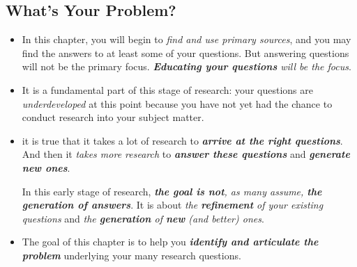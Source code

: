 \documentclass[11pt]{article}
\begin{document}
\subsection{What's Your Problem?}
\begin{itemize}
\item In this chapter, you will begin to \emph{find and use primary sources}, and you may find the answers to at least some of your questions. But answering questions will not be the primary focus. \emph{\textbf{Educating your questions} will be the focus}.

\item It is a fundamental part of this stage of research: your questions are \emph{underdeveloped} at this point because you have not yet had the chance to conduct research into your subject matter.

\item it is true that it takes a lot of research to \emph{\textbf{arrive at the right questions}}.  And then it \emph{takes more research} to \emph{\textbf{answer these questions}} and \emph{\textbf{generate new ones}}. 

In this early stage of research, \emph{\textbf{the goal is not}, as many assume, \textbf{the generation of answers}}. It is about \emph{the \textbf{refinement} of your existing questions} and \emph{the \textbf{generation} of \textbf{new} (and better) ones}.

\item The goal of this chapter is to help you \emph{\textbf{identify and articulate the problem}} underlying your many research questions.
\end{itemize}
\end{document}
